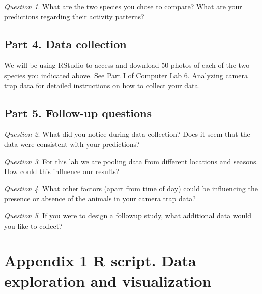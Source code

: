 \documentclass[]{book}
\begin{document}
\emph{Question 1}. What are the two species you chose to compare? What are your predictions regarding their activity patterns?

\hypertarget{part-4.-data-collection}{%
\section*{Part 4. Data collection}\label{part-4.-data-collection}}

We will be using RStudio to access and download 50 photos of each of the two species you indicated above. See Part I of Computer Lab 6. Analyzing camera trap data for detailed instructions on how to collect your data.

\hypertarget{part-5.-follow-up-questions}{%
\section*{Part 5. Follow-up questions}\label{part-5.-follow-up-questions}}

\emph{Question 2}. What did you notice during data collection? Does it seem that the data were consistent with your predictions?

\emph{Question 3}. For this lab we are pooling data from different locations and seasons. How could this influence our results?

\emph{Question 4}. What other factors (apart from time of day) could be influencing the presence or absence of the animals in your camera trap data?

\emph{Question 5}. If you were to design a followup study, what additional data would you like to collect?

\hypertarget{appendix-1-r-script.-data-exploration-and-visualization}{%
\chapter*{Appendix 1 R script. Data exploration and visualization}\label{appendix-1-r-script.-data-exploration-and-visualization}}
\end{document}
